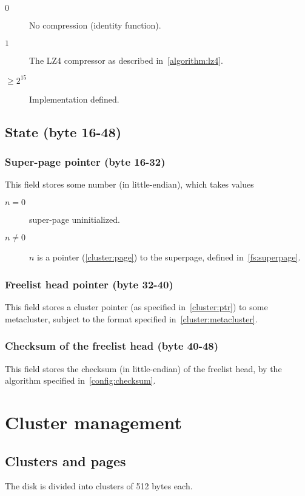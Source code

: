 \documentclass[11pt,a4paper]{report}
\newcommand{\clustersize}{512 }
\begin{document}
        \begin{description}
            \item [$0$] No compression (identity function).
            \item [$1$] The LZ4 compressor as described
                in~\ref{algorithm:lz4}.
            \item [$\geq 2^{15}$] Implementation defined.
        \end{description}

    \section{State (byte 16-48)}
        \subsection{Super-page pointer (byte 16-32)}
        This field stores some number (in little-endian), which takes values

        \begin{description}
            \item [$n = 0$]    super-page uninitialized.
            \item [$n \neq 0$] $n$ is a pointer (\ref{cluster:page}) to the
                superpage, defined in~\ref{fs:superpage}.
        \end{description}

        \subsection{Freelist head pointer (byte 32-40)}
        \label{state:freelist_head}
        This field stores a cluster pointer (as specified in~\ref{cluster:ptr})
        to some metacluster, subject to the format specified
        in~\ref{cluster:metacluster}.

        \subsection{Checksum of the freelist head (byte 40-48)}
        This field stores the checksum (in little-endian) of the freelist
        head, by the algorithm specified in~\ref{config:checksum}.

    \chapter{Cluster management}

    \section{Clusters and pages}
        The disk is divided into clusters of \clustersize bytes each.
\end{document}
